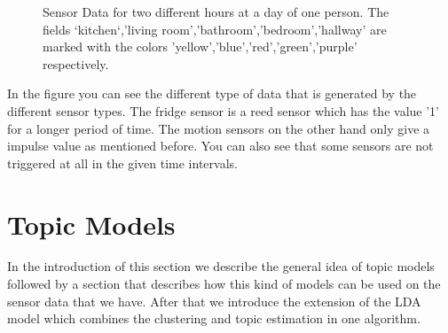 \documentclass[11pt,a4paper]{article}
\begin{document}
\begin{figure}[h!]
\begin{subfigure}[b]{0.45\textwidth}
  \end{subfigure}
  \caption{Sensor Data for two different hours at a day of one person. The fields `kitchen`,'living room','bathroom','bedroom','hallway' are marked with the colors 'yellow','blue','red','green','purple' respectively.}
  \label{fig:PlaineSensorData}
\end{figure}

In the figure you can see the different type of data that is generated by the different sensor types. The fridge sensor is a reed sensor which has the value '1' for a longer period of time. The motion sensors on the other hand only give a impulse value as mentioned before. You can also see that some sensors are not triggered at all in the given time intervals.



\pagebreak
\section{Topic Models}
\label{sec:TopicModels}
In the introduction of this section we describe the general idea of topic models followed by a section that describes how this kind of models can be used on the sensor data that we have. After that we introduce the extension of the LDA model which combines the clustering and topic estimation in one algorithm.
\end{document}
